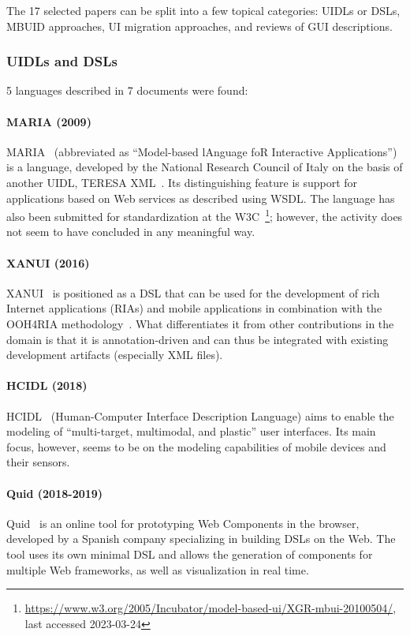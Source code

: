 The 17 selected papers can be split into a few topical categories: UIDLs or DSLs, MBUID approaches, UI migration approaches, and reviews of GUI descriptions.

\subsubsection{UIDLs and DSLs}
5 languages described in 7 documents were found:

\paragraph{MARIA (2009)}
MARIA~\cite{Paterno2009, MariaPDF} (abbreviated as \enquote{Model-based lAnguage foR Interactive Applications}) is a language, developed by the National Research Council of Italy on the basis of another UIDL, TERESA XML~\cite{mori2004}.
Its distinguishing feature is support for applications based on Web services as described using WSDL\@.
The language has also been submitted for standardization at the W3C~\footnote{\url{https://www.w3.org/2005/Incubator/model-based-ui/XGR-mbui-20100504/}, last accessed 2023-03-24};
however, the activity does not seem to have concluded in any meaningful way.

\paragraph{XANUI (2016)}
XANUI~\cite{hermida2016xanui} is positioned as a DSL that can be used for the development of rich Internet applications (RIAs) and mobile applications in combination with the OOH4RIA methodology~\cite{Meli2008}.
What differentiates it from other contributions in the domain is that it is annotation-driven and can thus be integrated with existing development artifacts (especially XML files).

\paragraph{HCIDL (2018)}
HCIDL~\cite{Gaouar2018} (Human-Computer Interface Description Language) aims to enable the modeling of \enquote{multi-target, multimodal, and plastic} user interfaces.
Its main focus, however, seems to be on the modeling capabilities of mobile devices and their sensors.

\paragraph{Quid (2018-2019)}
Quid~\cite{molina2018quid, Molina2019} is an online tool for prototyping Web Components in the browser, developed by a Spanish company specializing in building DSLs on the Web.
The tool uses its own minimal DSL and allows the generation of components for multiple Web frameworks, as well as visualization in real time.

